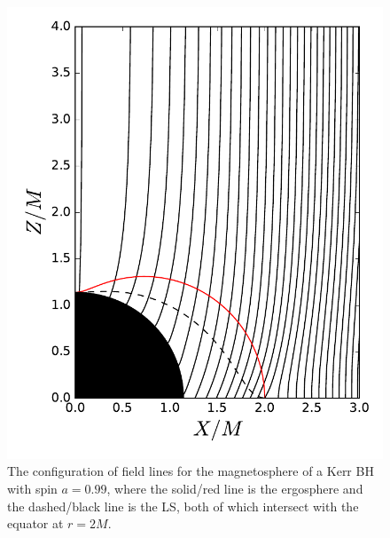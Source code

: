 \documentclass[aps,prd,reprint,nofootinbib, superscriptaddress]{revtex4-1}
\begin{document}
\begin{figure}
\includegraphics[scale=0.55]{f1}
\caption{\label{fig:field_lines} The configuration of field lines for the magnetosphere of a Kerr BH with spin $a=0.99$,
where the solid/red line is the ergosphere and the dashed/black line is the LS, both of which intersect with
the equator at $r=2 M$. }
\end{figure}
\end{document}
